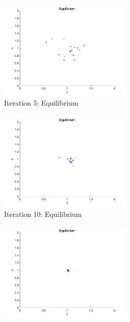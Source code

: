 \begin{figure}[H]
\begin{subfigure}[b]{0.45\textwidth}
\begin{center}
\includegraphics[width=0.7\textwidth]{img/mdme/equilibrium5}
\caption{Iteration 5: Equilibrium}
\end{center}
\end{subfigure}
\begin{subfigure}[b]{0.45\textwidth}
\begin{center}
\includegraphics[width=0.7\textwidth]{img/mdme/equilibrium10}
\caption{Iteration 10: Equilibrium}
\end{center}
\end{subfigure}
\begin{subfigure}[b]{0.45\textwidth}
\begin{center}
\includegraphics[width=0.7\textwidth]{img/mdme/equilibrium25}

\end{center}
\end{subfigure}
\end{figure}
